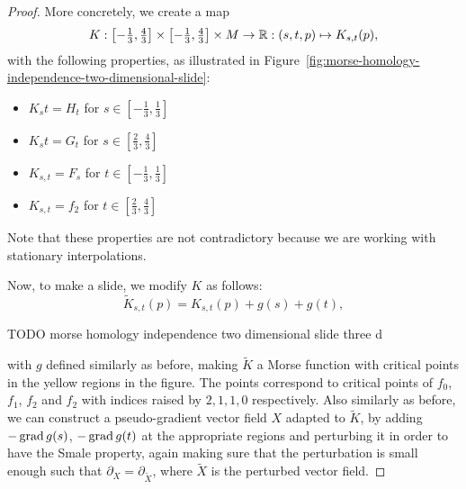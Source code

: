 \begin{proof}
More concretely, we create a map
\[
    K: \left[-\tfrac{1}{3}, \tfrac{4}{3}\right] \times \left[-\tfrac{1}{3}, \tfrac{4}{3}\right] \times M \to  \mathbb{R}:  (s, t, p) \mapsto K_{s, t}(p)
,\] 
with the following properties, as illustrated in Figure~\ref{fig:morse-homology-independence-two-dimensional-slide}:
\begin{itemize}
    \item $K_st = H_t$ for  $s \in \left[-\tfrac{1}{3}, \tfrac{1}{3}\right]$
        \item $K_st = G_t$ for  $s \in \left[\tfrac{2}{3}, \tfrac{4}{3}\right]$
        \item $K_{s, t} = F_s$ for $t \in \left[-\tfrac{1}{3}, \tfrac{1}{3}\right]$ 
        \item $K_{s,t} = f_2$ for $t \in \left[\tfrac{2}{3}, \tfrac{4}{3}\right]$
\end{itemize}
Note that these properties are not contradictory because we are working with stationary interpolations.

Now, to make a slide, we modify $K$ as follows:
 \[
     \tilde{K}_{s,t}(p) = K_{s,t}(p) + g(s) + g(t)
,\] 

\begin{marginfigure}
    \centering
    \caption{TODO morse homology independence two dimensional slide three d}
    \label{fig:morse-homology-independence-two-dimensional-slide-three-d}
\end{marginfigure}

with $g$ defined similarly as before, making $\tilde{K}$ a Morse function with critical points in the yellow regions in the figure.
The points correspond to critical points of $f_0$, $f_1$, $f_2$ and $f_2$ with indices raised by $2, 1, 1, 0$ respectively.
Also similarly as before, we can construct a pseudo-gradient vector field $X$ adapted to $\tilde{K}$, by adding $-\operatorname{grad} g(s)$, $-\operatorname{grad} g(t)$ at the appropriate regions and perturbing it in order to have the Smale property, again making sure that the perturbation is small enough such that $\partial_X = \partial_{\tilde X}$, where $\tilde{X}$ is the perturbed vector field.


\end{proof}
